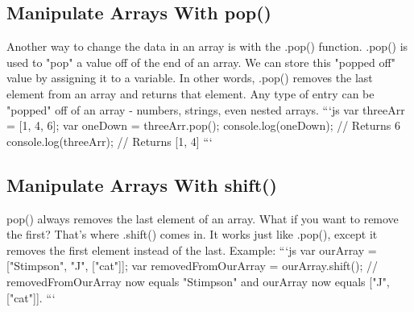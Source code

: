 \documentclass{article}%
\begin{document}
%
\subsection{Manipulate Arrays With pop()}%
\label{subsec:ManipulateArraysWithpop()}%
Another way to change the data in an array is with the .pop() function.\newline%
.pop() is used to "pop" a value off of the end of an array. We can store this "popped off" value by assigning it to a variable. In other words, .pop() removes the last element from an array and returns that element.\newline%
Any type of entry can be "popped" off of an array {-} numbers, strings, even nested arrays.\newline%
```js\newline%
var threeArr = {[}1, 4, 6{]};\newline%
var oneDown = threeArr.pop();\newline%
console.log(oneDown); // Returns 6\newline%
console.log(threeArr); // Returns {[}1, 4{]}\newline%
```\newline%

%
\subsection{Manipulate Arrays With shift()}%
\label{subsec:ManipulateArraysWithshift()}%
pop() always removes the last element of an array. What if you want to remove the first?\newline%
That's where .shift() comes in. It works just like .pop(), except it removes the first element instead of the last.\newline%
Example:\newline%
```js\newline%
var ourArray = {[}"Stimpson", "J", {[}"cat"{]}{]};\newline%
var removedFromOurArray = ourArray.shift();\newline%
// removedFromOurArray now equals "Stimpson" and ourArray now equals {[}"J", {[}"cat"{]}{]}.\newline%
```\newline%

%
\end{document}
